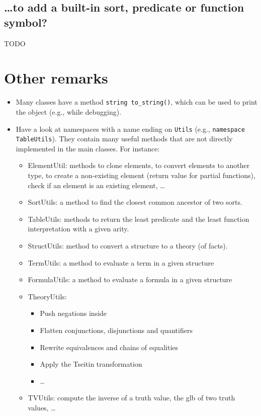 \documentclass{article}
\begin{document}
\subsection*{\ldots to add a built-in sort, predicate or function symbol?}

TODO

\section{Other remarks}

\begin{itemize}
	\item Many classes have a method \texttt{string to\_string()}, which can be used to print the object (e.g., while debugging).
	\item Have a look at namespaces with a name ending on \texttt{Utils} (e.g., \texttt{namespace TableUtils}). They contain many useful methods that are not directly implemented in the main classes. For instance:
	\begin{itemize}
		\item ElementUtil: methods to clone elements, to convert elements to another type, to create a non-existing element (return value for partial functions), check if an element is an existing element, \ldots
		\item SortUtils: a method to find the closest common ancestor of two sorts.
		\item TableUtils: methods to return the least predicate and the least function interpretation with a given arity.
		\item StructUtils: method to convert a structure to a theory (of facts).
		\item TermUtils: a method to evaluate a term in a given structure
		\item FormulaUtils: a method to evaluate a formula in a given structure
		\item TheoryUtils:
		\begin{itemize}
			\item Push negations inside
			\item Flatten conjunctions, disjunctions and quantifiers
			\item Rewrite equivalences and chains of equalities
			\item Apply the Tseitin transformation
			\item \ldots
		\end{itemize}
		\item TVUtils: compute the inverse of a truth value, the glb of two truth values, \ldots
	\end{itemize}
\end{itemize}
\end{document}

